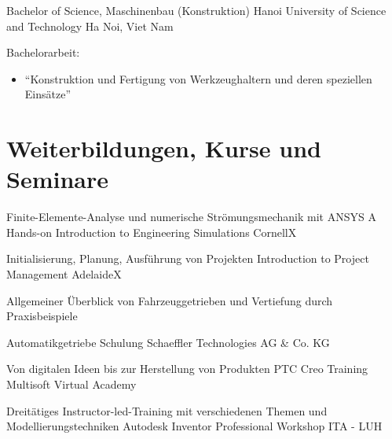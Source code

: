 \documentclass[11pt,a4paper,sans]{moderncv}
\begin{document}
{Bachelor of Science, Maschinenbau (Konstruktion)}
{Hanoi University of Science and Technology}
{Ha Noi, Viet Nam}
{}
{
    Bachelorarbeit:
    \begin{itemize}
        \item "`Konstruktion und Fertigung von Werkzeughaltern und deren speziellen Einsätze"'
    \end{itemize}
}



\section{\textbf{Weiterbildungen, Kurse und Seminare}}

{Finite-Elemente-Analyse und numerische Strömungsmechanik mit ANSYS}
{A Hands-on Introduction to Engineering Simulations}
{CornellX}
{}
{}


{Initialisierung, Planung, Ausführung von Projekten}
{Introduction to Project Management}
{AdelaideX}
{}
{}


{
\parbox[t]{10cm}{Allgemeiner Überblick von Fahrzeuggetrieben und Vertiefung durch Praxisbeispiele}
}
{Automatikgetriebe Schulung}
{Schaeffler Technologies AG \& Co. KG}
{}
{}


{Von digitalen Ideen bis zur Herstellung von Produkten}
{PTC Creo Training}
{Multisoft Virtual Academy}
{}
{}



{Dreitätiges Instructor-led-Training mit verschiedenen Themen und Modellierungstechniken}
{Autodesk Inventor Professional Workshop}
{ITA - LUH}
{}
{}


\end{document}
